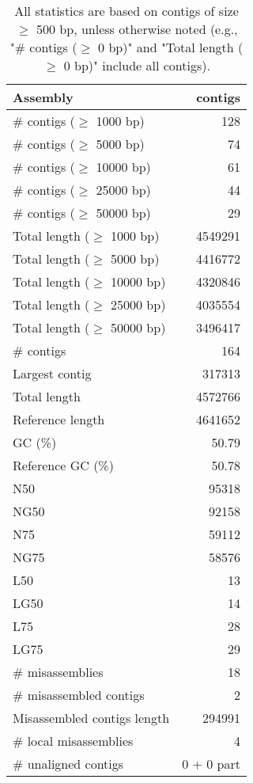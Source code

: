 \documentclass[12pt,a4paper]{article}
\begin{document}
\begin{table}[ht]
\begin{center}
\caption{All statistics are based on contigs of size $\geq$ 500 bp, unless otherwise noted (e.g., "\# contigs ($\geq$ 0 bp)" and "Total length ($\geq$ 0 bp)" include all contigs).}
\begin{tabular}{|l*{1}{|r}|}
\hline
Assembly & contigs \\ \hline
\# contigs ($\geq$ 1000 bp) & 128 \\ \hline
\# contigs ($\geq$ 5000 bp) & 74 \\ \hline
\# contigs ($\geq$ 10000 bp) & 61 \\ \hline
\# contigs ($\geq$ 25000 bp) & 44 \\ \hline
\# contigs ($\geq$ 50000 bp) & 29 \\ \hline
Total length ($\geq$ 1000 bp) & 4549291 \\ \hline
Total length ($\geq$ 5000 bp) & 4416772 \\ \hline
Total length ($\geq$ 10000 bp) & 4320846 \\ \hline
Total length ($\geq$ 25000 bp) & 4035554 \\ \hline
Total length ($\geq$ 50000 bp) & 3496417 \\ \hline
\# contigs & 164 \\ \hline
Largest contig & 317313 \\ \hline
Total length & 4572766 \\ \hline
Reference length & 4641652 \\ \hline
GC (\%) & 50.79 \\ \hline
Reference GC (\%) & 50.78 \\ \hline
N50 & 95318 \\ \hline
NG50 & 92158 \\ \hline
N75 & 59112 \\ \hline
NG75 & 58576 \\ \hline
L50 & 13 \\ \hline
LG50 & 14 \\ \hline
L75 & 28 \\ \hline
LG75 & 29 \\ \hline
\# misassemblies & 18 \\ \hline
\# misassembled contigs & 2 \\ \hline
Misassembled contigs length & 294991 \\ \hline
\# local misassemblies & 4 \\ \hline
\# unaligned contigs & 0 + 0 part \\ \hline

\end{tabular}
\end{center}
\end{table}
\end{document}
